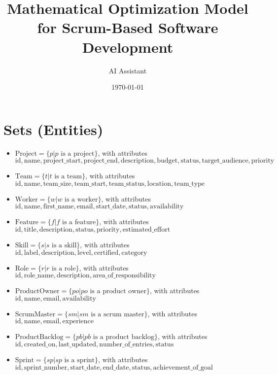 \documentclass[11pt]{article}
\title{Mathematical Optimization Model for Scrum-Based Software Development}
\author{AI Assistant}
\date{\today}
\begin{document}
\maketitle
\tableofcontents

\section{Sets (Entities)}
\begin{itemize}
    \item $\text{Project} = \{p | p \text{ is a project}\}$, with attributes $\text{id}, \text{name}, \text{project\_start}, \text{project\_end}, \text{description}, \text{budget}, \text{status}, \text{target\_audience}, \text{priority}$
    \item $\text{Team} = \{t | t \text{ is a team}\}$, with attributes $\text{id}, \text{name}, \text{team\_size}, \text{team\_start}, \text{team\_status}, \text{location}, \text{team\_type}$
    \item $\text{Worker} = \{w | w \text{ is a worker}\}$, with attributes $\text{id}, \text{name}, \text{first\_name}, \text{email}, \text{start\_date}, \text{status}, \text{availability}$
    \item $\text{Feature} = \{f | f \text{ is a feature}\}$, with attributes $\text{id}, \text{title}, \text{description}, \text{status}, \text{priority}, \text{estimated\_effort}$
    \item $\text{Skill} = \{s | s \text{ is a skill}\}$, with attributes $\text{id}, \text{label}, \text{description}, \text{level}, \text{certified}, \text{category}$
    \item $\text{Role} = \{r | r \text{ is a role}\}$, with attributes $\text{id}, \text{role\_name}, \text{description}, \text{area\_of\_responsibility}$
    \item $\text{ProductOwner} = \{po | po \text{ is a product owner}\}$, with attributes $\text{id}, \text{name}, \text{email}, \text{availability}$
    \item $\text{ScrumMaster} = \{sm | sm \text{ is a scrum master}\}$, with attributes $\text{id}, \text{name}, \text{email}, \text{experience}$
    \item $\text{ProductBacklog} = \{pb | pb \text{ is a product backlog}\}$, with attributes $\text{id}, \text{created\_on}, \text{last\_updated}, \text{number\_of\_entries}, \text{status}$
    \item $\text{Sprint} = \{sp | sp \text{ is a sprint}\}$, with attributes $\text{id}, \text{sprint\_number}, \text{start\_date}, \text{end\_date}, \text{status}, \text{achievement\_of\_goal}$

\end{itemize}
\end{document}
